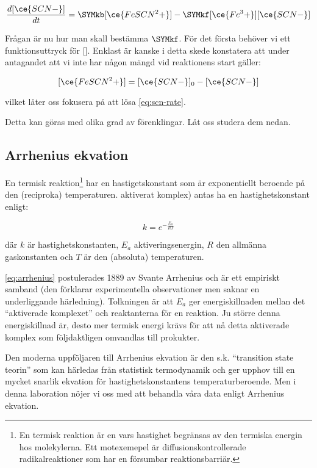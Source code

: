 \begin{equation}
  \label{eq:scn-rate}
  \frac{d[\ce{SCN-}]}{dt} = \SYMkb[\ce{FeSCN^2+}] - \SYMkf[\ce{Fe^3+}][\ce{SCN-}]
\end{equation}

Frågan är nu hur man skall bestämma $\SYMkf$. För det första behöver vi ett funktionsuttryck
för []. Enklast är kanske i detta skede konstatera att under antagandet att
vi inte har någon mängd  vid reaktionens start gäller:

\begin{equation}
  \label{eq:fescn-scn-rel}
  [\ce{FeSCN^2+}] = [\ce{SCN-}]_0 - [\ce{SCN-}]
\end{equation}

vilket låter oss fokusera på att lösa \cref{eq:scn-rate}.

Detta kan göras med olika grad av förenklingar. Låt oss studera dem nedan.


\subsection{Arrhenius ekvation}
En termisk reaktion\footnote{En termisk reaktion är en vars hastighet begränsas av den termiska
energin hos molekylerna. Ett motexemepel är diffusionskontrollerade
radikalreaktioner som har en försumbar reaktionsbarriär.} har en
hastigetskonstant som är exponentiellt beroende på den (reciproka) temperaturen.
aktiverat komplex) antas ha en hastighetskonstant enligt:

\begin{equation}
  \label{eq:arrhenius}
  k = e^{-\frac{E_a}{RT}}
\end{equation}

där $k$ är hastighetskonstanten, $E_a$ aktiveringsenergin, $R$ den
allmänna gaskonstanten och $T$ är den (absoluta) temperaturen.

\cref{eq:arrhenius} postulerades 1889 av Svante Arrhenius och är ett
empiriskt samband (den förklarar experimentella observationer men saknar
en underliggande härledning). Tolkningen är att $E_a$ ger
energiskillnaden mellan det ``aktiverade komplexet'' och reaktanterna för
en reaktion. Ju större denna energiskillnad är, desto mer termisk energi
krävs för att nå detta aktiverade komplex som följdaktligen omvandlas
till prokukter.

Den moderna uppföljaren till Arrhenius ekvation är den s.k. ``transition
state teorin'' som kan härledas från statistisk termodynamik och ger
upphov till en mycket snarlik ekvation för hastighetskonstantens
temperaturberoende. Men i denna laboration nöjer vi oss med att behandla
våra data enligt Arrhenius ekvation.

